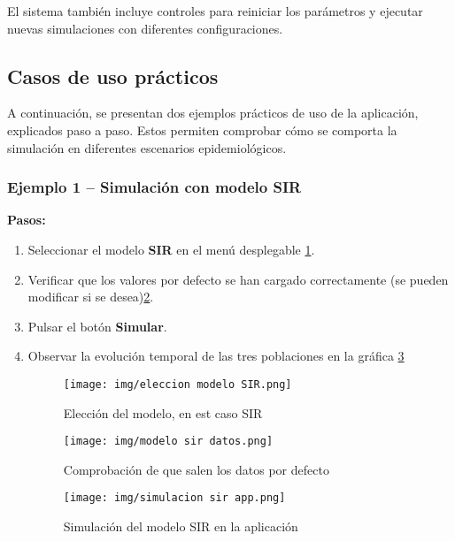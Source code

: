 El sistema también incluye controles para reiniciar los parámetros y ejecutar nuevas simulaciones con diferentes configuraciones.

\subsection{Casos de uso prácticos}

A continuación, se presentan dos ejemplos prácticos de uso de la aplicación, explicados paso a paso. Estos permiten comprobar cómo se comporta la simulación en diferentes escenarios epidemiológicos.

\vspace{1em}
\subsubsection{Ejemplo 1 – Simulación con modelo SIR}

\textbf{Pasos:}
\begin{enumerate}
    \item Seleccionar el modelo \textbf{SIR} en el menú desplegable \ref{fig:eleccion sir}.
     \item Verificar que los valores por defecto se han cargado correctamente (se pueden modificar si se desea)\ref{fig:datos defecto}.
      \item Pulsar el botón \textbf{Simular}.

     
    \item Observar la evolución temporal de las tres poblaciones en la gráfica \ref{fig:simulacion sir ap}
    \begin{figure}[H]
        \centering
        \texttt{[image: img/eleccion modelo SIR.png]}
        \caption{Elección del modelo, en est caso SIR}
        \label{fig:eleccion sir}
        \vspace{0.5cm} %
    \end{figure}
   

    \begin{figure}[H]
        \centering
        \texttt{[image: img/modelo sir datos.png]}
        \caption{Comprobación de que salen los datos por defecto}
        \label{fig:datos defecto}
        \vspace{0.5cm} %
    \end{figure}
   
   
    \begin{figure}[H]
        \centering
        \texttt{[image: img/simulacion sir app.png]}
        \caption{Simulación del modelo SIR en la aplicación}
        \label{fig:simulacion sir ap}
        \vspace{0.5cm} %
    \end{figure}
\end{enumerate}

